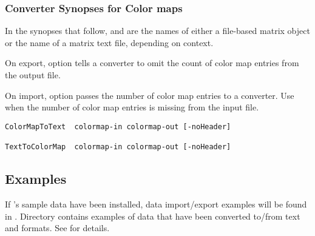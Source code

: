 \subsubsection{Converter Synopses for Color maps}

In the synopses that follow,  and
 are the names of either a \sr{} file-based
matrix object or the name of a matrix text file, depending on context.

On export, option  tells a converter to omit the
count of color map entries from the output file.

On import, option  passes the number of color map
entries to a converter.  Use  when the number of
color map entries is missing from the input file.

\begin{verbatim}
ColorMapToText  colormap-in colormap-out [-noHeader]

TextToColorMap  colormap-in colormap-out [-noHeader]
\end{verbatim}

\subsection{Examples}
\label{sec:converter_ex}

If \sr{}'s sample data have been installed, data import/export
examples will be found in .
Directory  contains examples of
data that have been converted to/from text and \sr{} formats.  See
 for details.

